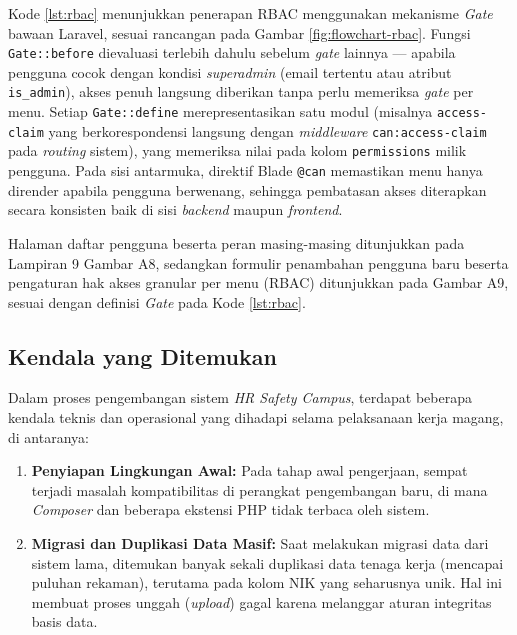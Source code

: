 Kode \ref{lst:rbac} menunjukkan penerapan RBAC menggunakan mekanisme \textit{Gate} bawaan Laravel, sesuai rancangan pada Gambar \ref{fig:flowchart-rbac}. Fungsi \texttt{Gate::before} dievaluasi terlebih dahulu sebelum \textit{gate} lainnya --- apabila pengguna cocok dengan kondisi \textit{superadmin} (email tertentu atau atribut \texttt{is\_admin}), akses penuh langsung diberikan tanpa perlu memeriksa \textit{gate} per menu. Setiap \texttt{Gate::define} merepresentasikan satu modul (misalnya \texttt{access-claim} yang berkorespondensi langsung dengan \textit{middleware} \texttt{can:access-claim} pada \textit{routing} sistem), yang memeriksa nilai pada kolom \texttt{permissions} milik pengguna. Pada sisi antarmuka, direktif Blade \texttt{@can} memastikan menu hanya dirender apabila pengguna berwenang, sehingga pembatasan akses diterapkan secara konsisten baik di sisi \textit{backend} maupun \textit{frontend}.

Halaman daftar pengguna beserta peran masing-masing ditunjukkan pada Lampiran 9 Gambar A8, sedangkan formulir penambahan pengguna baru beserta pengaturan hak akses granular per menu (RBAC) ditunjukkan pada Gambar A9, sesuai dengan definisi \textit{Gate} pada Kode \ref{lst:rbac}.

\subsection{Kendala yang Ditemukan}
Dalam proses pengembangan sistem \textit{HR Safety Campus}, terdapat beberapa kendala teknis dan operasional yang dihadapi selama pelaksanaan kerja magang, di antaranya:

\begin{enumerate}
    \item \textbf{Penyiapan Lingkungan Awal:} Pada tahap awal pengerjaan, sempat terjadi masalah kompatibilitas di perangkat pengembangan baru, di mana \textit{Composer} dan beberapa ekstensi PHP tidak terbaca oleh sistem.
    \item \textbf{Migrasi dan Duplikasi Data Masif:} Saat melakukan migrasi data dari sistem lama, ditemukan banyak sekali duplikasi data tenaga kerja (mencapai puluhan rekaman), terutama pada kolom NIK yang seharusnya unik. Hal ini membuat proses unggah (\textit{upload}) gagal karena melanggar aturan integritas basis data.
\end{enumerate}

